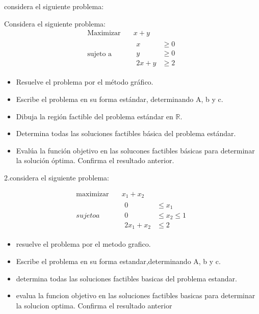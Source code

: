 \documentclass{article}
\begin{document}
considera el siguiente problema:

Considera el siguiente problema:
\begin{equation*}
  \begin{aligned}
    \text{Maximizar}\quad & x+y \\
    \text{sujeto a}\quad &
    \begin{aligned}
      x & \geq 0\\
      y & \geq 0\\
      2x + y & \geq 2
    \end{aligned}
  \end{aligned}
\end{equation*}
\begin{itemize}
  \item Resuelve el problema por el método gráfico.\\
  \item Escribe el problema en su forma estándar, determinando A, b y c.\\
  \item Dibuja la región factible del problema estándar en $\mathbb{R}$.\\
  \item Determina todas las soluciones factibles básica del problema estándar.\\
  \item Evalúa la función objetivo en las solucones factibles básicas para determinar la solución óptima. Confirma el resultado anterior.

\end{itemize}
2.considera el siguiente problema:

\begin{equation}
\begin{aligned}
  \text{maximizar}\quad & x_1+x_2\\
  sujeto a \quad &
  \begin{aligned}
    0&\leq x_1\\
    0&\leq x_2\leq1\\
    2x_1+x_2& \leq2
    \end{aligned}
\end{aligned}
\end{equation}

\begin{itemize}

  \item resuelve el problema por el metodo grafico.
  \item Escribe el problema en su forma estandar,determinando A, b y c.
  \item determina todas las soluciones factibles basicas del problema estandar.
  \item evalua la funcion objetivo en las soluciones factibles basicas para determinar la solucion optima. Confirma el resultado anterior
 \end{itemize}
\end{document}
